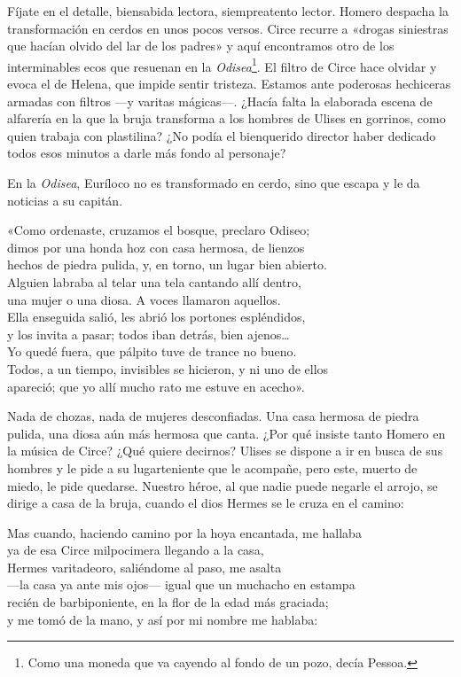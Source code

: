 Fíjate en el detalle, biensabida lectora, siempreatento lector. Homero despacha la transformación en cerdos en unos pocos versos. Circe recurre a «drogas siniestras que hacían olvido del lar de los padres» y aquí encontramos otro de los interminables ecos que resuenan en la \emph{Odisea}\footnote{Como una moneda que va cayendo al fondo de un pozo, decía Pessoa.}. El filtro de Circe hace olvidar y evoca el de Helena, que impide sentir tristeza. Estamos ante poderosas hechiceras armadas con filtros ---y varitas mágicas---. ¿Hacía falta la elaborada escena de alfarería en la que la bruja transforma a los hombres de Ulises en gorrinos, como quien trabaja con plastilina? ¿No podía el bienquerido director haber dedicado todos esos minutos a darle más fondo al personaje?

En la \emph{Odisea}, Euríloco no es transformado en cerdo, sino que escapa y le da noticias a su capitán.

\begin{versocita}
«Como ordenaste, cruzamos el bosque, preclaro Odiseo;\\
dimos por una honda hoz con casa hermosa, de lienzos\\
hechos de piedra pulida, y, en torno, un lugar bien abierto.\\
Alguien labraba al telar una tela cantando allí dentro,\\
una mujer o una diosa. A voces llamaron aquellos.\\
Ella enseguida salió, les abrió los portones espléndidos,\\
y los invita a pasar; todos iban detrás, bien ajenos…\\
Yo quedé fuera, que pálpito tuve de trance no bueno.\\
Todos, a un tiempo, invisibles se hicieron, y ni uno de ellos\\
apareció; que yo allí mucho rato me estuve en acecho».
\end{versocita}

Nada de chozas, nada de mujeres desconfiadas. Una casa hermosa de piedra pulida, una diosa aún más hermosa que canta. ¿Por qué insiste tanto Homero en la música de Circe? ¿Qué quiere decirnos? Ulises se dispone a ir en busca de sus hombres y le pide a su lugarteniente que le acompañe, pero este, muerto de miedo, le pide quedarse. Nuestro héroe, al que nadie puede negarle el arrojo, se dirige a casa de la bruja, cuando el dios Hermes se le cruza en el camino:

\begin{versocita}
Mas cuando, haciendo camino por la hoya encantada, me hallaba\\
ya de esa Circe milpocimera llegando a la casa,\\
Hermes varitadeoro, saliéndome al paso, me asalta\\
---la casa ya ante mis ojos--- igual que un muchacho en estampa\\
recién de barbiponiente, en la flor de la edad más graciada;\\
y me tomó de la mano, y así por mi nombre me hablaba:
\end{versocita}

